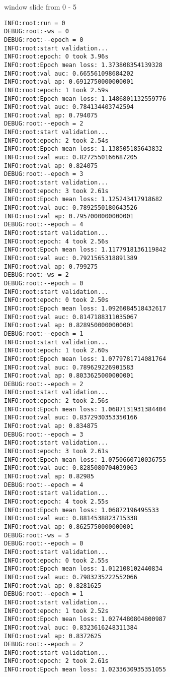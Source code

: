 \documentclass[11pt]{article}
\begin{document}
window slide from 0 - 5
\begin{verbatim}
INFO:root:run = 0
DEBUG:root:-ws = 0
DEBUG:root:--epoch = 0
INFO:root:start validation...
INFO:root:epoch: 0 took 3.96s
INFO:root:Epoch mean loss: 1.373808354139328
INFO:root:val auc: 0.665561098684202
INFO:root:val ap: 0.6912750000000001
INFO:root:epoch: 1 took 2.59s
INFO:root:Epoch mean loss: 1.1486801132559776
INFO:root:val auc: 0.784134403742594
INFO:root:val ap: 0.794075
DEBUG:root:--epoch = 2
INFO:root:start validation...
INFO:root:epoch: 2 took 2.54s
INFO:root:Epoch mean loss: 1.138505185643832
INFO:root:val auc: 0.8272550166687205
INFO:root:val ap: 0.824075
DEBUG:root:--epoch = 3
INFO:root:start validation...
INFO:root:epoch: 3 took 2.61s
INFO:root:Epoch mean loss: 1.125243417918682
INFO:root:val auc: 0.7892550180643526
INFO:root:val ap: 0.7957000000000001
DEBUG:root:--epoch = 4
INFO:root:start validation...
INFO:root:epoch: 4 took 2.56s
INFO:root:Epoch mean loss: 1.1177918136119842
INFO:root:val auc: 0.7921565318891389
INFO:root:val ap: 0.799275
DEBUG:root:-ws = 2
DEBUG:root:--epoch = 0
INFO:root:start validation...
INFO:root:epoch: 0 took 2.50s
INFO:root:Epoch mean loss: 1.0926084518432617
INFO:root:val auc: 0.8147188311035067
INFO:root:val ap: 0.8289500000000001
DEBUG:root:--epoch = 1
INFO:root:start validation...
INFO:root:epoch: 1 took 2.60s
INFO:root:Epoch mean loss: 1.0779781714081764
INFO:root:val auc: 0.789629226901583
INFO:root:val ap: 0.8033625000000001
DEBUG:root:--epoch = 2
INFO:root:start validation...
INFO:root:epoch: 2 took 2.56s
INFO:root:Epoch mean loss: 1.0687131931384404
INFO:root:val auc: 0.8372930353350166
INFO:root:val ap: 0.834875
DEBUG:root:--epoch = 3
INFO:root:start validation...
INFO:root:epoch: 3 took 2.61s
INFO:root:Epoch mean loss: 1.0750660710036755
INFO:root:val auc: 0.8285080704039063
INFO:root:val ap: 0.82985
DEBUG:root:--epoch = 4
INFO:root:start validation...
INFO:root:epoch: 4 took 2.55s
INFO:root:Epoch mean loss: 1.06872196495533
INFO:root:val auc: 0.8814538823715338
INFO:root:val ap: 0.8625750000000001
DEBUG:root:-ws = 3
DEBUG:root:--epoch = 0
INFO:root:start validation...
INFO:root:epoch: 0 took 2.55s
INFO:root:Epoch mean loss: 1.012108102440834
INFO:root:val auc: 0.7983235222552066
INFO:root:val ap: 0.8281625
DEBUG:root:--epoch = 1
INFO:root:start validation...
INFO:root:epoch: 1 took 2.52s
INFO:root:Epoch mean loss: 1.0274480804800987
INFO:root:val auc: 0.8323616248311384
INFO:root:val ap: 0.8372625
DEBUG:root:--epoch = 2
INFO:root:start validation...
INFO:root:epoch: 2 took 2.61s
INFO:root:Epoch mean loss: 1.0233630935351055

\end{verbatim}
\end{document}
